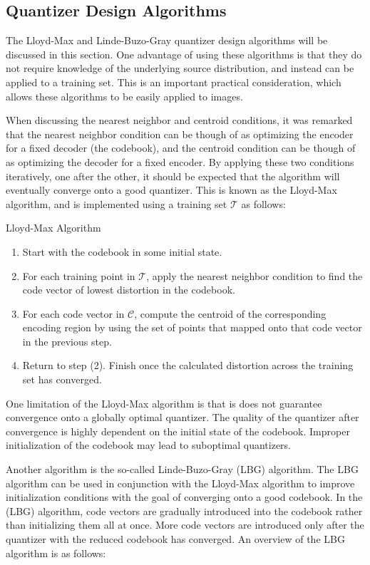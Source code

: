 \subsection{Quantizer Design Algorithms}
\label{sec:quant_design_algos}
The Lloyd-Max and Linde-Buzo-Gray quantizer design algorithms will be discussed in this section. One advantage of using these algorithms is that they do not require knowledge of the underlying source distribution, and instead can be applied to a training set. This is an important practical consideration, which allows these algorithms to be easily applied to images.

When discussing the nearest neighbor and centroid conditions, it was remarked that the nearest neighbor condition can be though of as optimizing the encoder for a fixed decoder (the codebook), and the centroid condition can be though of as optimizing the decoder for a fixed encoder. By applying these two conditions iteratively, one after the other, it should be expected that the algorithm will eventually converge onto a good quantizer. This is known as the Lloyd-Max algorithm, and is implemented using a training set $\mathcal{T}$ as follows:

{\sc \noindent Lloyd-Max Algorithm}
\begin{enumerate}
\item Start with the codebook in some initial state.
\item For each training point in $\mathcal{T}$, apply the nearest neighbor condition to find the code vector of lowest distortion in the codebook.
\item For each code vector in $\mathcal{C}$, compute the centroid of the corresponding encoding region by using the set of points that mapped onto that code vector in the previous step.
\item Return to step (2). Finish once the calculated distortion across the training set has converged.
\end{enumerate}
One limitation of the Lloyd-Max algorithm is that is does not guarantee convergence onto a globally optimal quantizer. The quality of the quantizer after convergence is highly dependent on the initial state of the codebook. Improper initialization of the codebook may lead to suboptimal quantizers.

Another algorithm is the so-called Linde-Buzo-Gray (LBG) algorithm. The LBG algorithm can be used in conjunction with the Lloyd-Max algorithm to improve initialization conditions with the goal of converging onto a good codebook. In the (LBG) algorithm, code vectors are gradually introduced into the codebook rather than initializing them all at once. More code vectors are introduced only after the quantizer with the reduced codebook has converged. An overview of the LBG algorithm is as follows:

